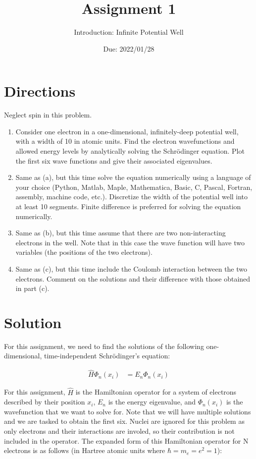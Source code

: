\documentclass[10pt, oneside, letterpaper]{article}
\title{Assignment 1}
\author{Introduction: Infinite Potential Well}
\date{Due: 2022/01/28}
\begin{document}
\maketitle
\thispagestyle{fancy}

\section{Directions}

Neglect spin in this problem.

\begin{enumerate}[label=(\alph*)]
  \item Consider one electron in a one-dimensional, infinitely-deep potential well, with a width of 10 in atomic units. Find the electron wavefunctions and allowed energy levels by analytically solving the Schrödinger equation. Plot the first six wave functions and give their associated eigenvalues.
  \item Same as (a), but this time solve the equation numerically using a language of your choice (Python, Matlab, Maple, Mathematica, Basic, C, Pascal, Fortran, assembly, machine code, etc.). Discretize the width of the potential well into at least 10 segments. Finite difference is preferred for solving the equation numerically.
  \item Same as (b), but this time assume that there are two non-interacting electrons in the well. Note that in this case the wave function will have two variables (the positions of the two electrons).
  \item Same as (c), but this time include the Coulomb interaction between the two electrons. Comment on the solutions and their difference with those obtained in part (c).
\end{enumerate}

\section{Solution}

For this assignment, we need to find the solutions of the following one-dimensional, time-independent Schr\"{o}dinger's equation:

\begin{align*}
  \hat{H}\Phi_n(x_i) &= {E_n}\Phi_n(x_i)
\end{align*}

For this assignment, $\hat{H}$ is the Hamiltonian operator for a system of electrons described by their position $x_{i}$, $E_n$ is the energy eigenvalue, and $\Phi_n(x_i)$ is the wavefunction that we want to solve for. Note that we will have multiple solutions and we are tasked to obtain the first six. Nuclei are ignored for this problem as only electrons and their interactions are involed, so their contribution is not included in the operator. The expanded form of this Hamiltonian operator for N electrons is as follows (in Hartree atomic units where $\hbar = m_e = e^2 = 1$):
\end{document}

